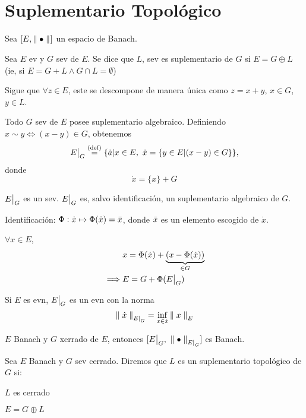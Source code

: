
\renewcommand{\catnum}{\theNPclase \ No Presencial}%
\renewcommand{\fecha}{6 de abril de 2020}


\section{Suplementario Topológico}

Sea $[E, \norm[]{\bullet}]$ un espacio de Banach.

\begin{defn}
Sea $E$ ev y $G$ sev de $E$. Se dice que $L$, sev es suplementario de $G$ si $E = G \oplus L$ (ie, si $E = G + L \wedge G \cap L = \emptyset$)
\end{defn}

Sigue que $\forall z \in E$, este se descompone de manera única como $z = x + y$, $x \in G$, $y \in L$.

Todo $G$ sev de $E$ posee suplementario algebraico. Definiendo $x \sim y \iff (x - y) \in G$, obtenemos $$
\restr{E}{G} \defeq \{ \dot{a} | x \in E,\ \dot{x} = \{ y \in E | (x - y )\in G \}  \},
$$ donde $$
\dot{x} = \{ x \} + G
$$

$\restr{E}{G}$ es un sev. $\restr{E}{G}$ es, salvo identificación, un suplementario algebraico de $G$.

Identificación: $\Phi: \dot{x} \mapsto \Phi ( \dot{x} ) = \Bar{x}$, donde $\Bar{x}$ es un elemento escogido de $\dot{x}$.

$\forall x \in E$,
\begin{align*}
&x = \Phi (\dot{x}) + \underbrace{(x - \Phi (\dot{x}))}_{\in G}\\
\implies & E = G + \Phi ( \restr{E}{G} )
\end{align*}

Si $E$ es evn, $\restr{E}{G}$ es un evn con la norma $$
\norm[{E |}_{G}]{\dot{x}} = \inf_{x \in \dot{x}} \norm[E]{x}
$$ 

\begin{exer}
$E$ Banach y $G$ xerrado de $E$, entonces $[\restr{E}{G},\ \norm[{E|}_{G}]{\bullet}]$ es Banach.
\end{exer}

\begin{defn}
Sea $E$ Banach y $G$ sev cerrado. Diremos que $L$ es un suplementario topológico de $G$ si:
\begin{ienumerate}
    \item $L$ es cerrado
    \item $E = G\oplus L$
\end{ienumerate}
\end{defn}


